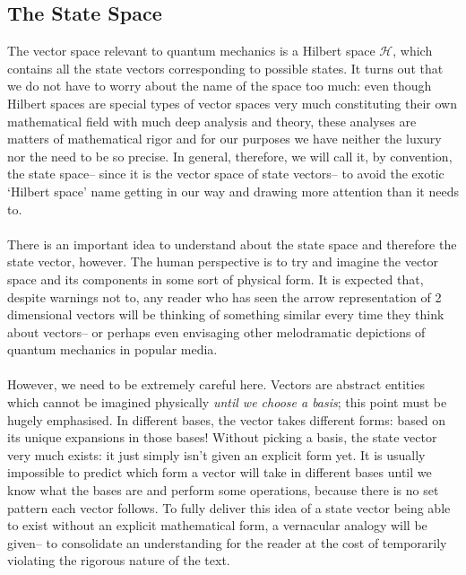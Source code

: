 \subsection{The State Space}
The vector space relevant to quantum mechanics is a Hilbert space $\mathscr{H}$, which contains all the state vectors corresponding to possible states. It turns out that we do not have to worry about the name of the space too much: even though Hilbert spaces are special types of vector spaces very much constituting their own mathematical field with much deep analysis and theory, these analyses are matters of mathematical rigor and for our purposes we have neither the luxury nor the need to be so precise. In general, therefore, we will call it, by convention, the state space-- since it is the vector space of state vectors-- to avoid the exotic `Hilbert space' name getting in our way and drawing more attention than it needs to.
\\\\
There is an important idea to understand about the state space and therefore the state vector, however. The human perspective is to try and imagine the vector space and its components in some sort of physical form. It is expected that, despite warnings not to, any reader who has seen the arrow representation of 2 dimensional vectors will be thinking of something similar every time they think about vectors-- or perhaps even envisaging other melodramatic depictions of  quantum mechanics in popular media.
\\\\
However, we need to be extremely careful here. Vectors are abstract entities which cannot be imagined physically \textit{until we choose a basis}; this point must be hugely emphasised. In different bases, the vector takes different forms: based on its unique expansions in those bases! Without picking a basis, the state vector very much exists: it just simply isn't given an explicit form yet. It is usually impossible to predict which form a vector will take in different bases until we know what the bases are and perform some operations, because there is no set pattern each vector follows. To fully deliver this idea of a state vector being able to exist without an explicit mathematical form, a vernacular analogy will be given-- to consolidate an understanding for the reader at the cost of temporarily violating the rigorous nature of the text. 
\\\\
